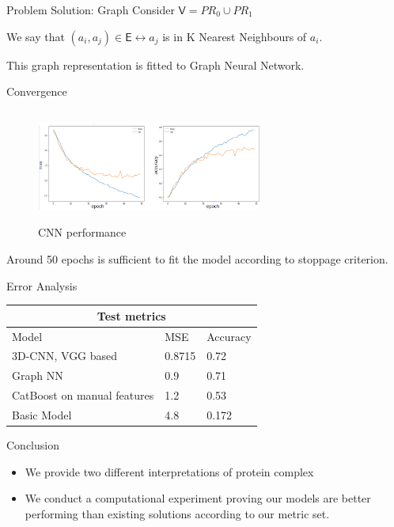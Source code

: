 \documentclass{beamer}
\begin{document}
\begin{frame}{Problem Solution: Graph}
Consider $\mathsf{V} = PR_0 \cup PR_1$
\bigskip

We say that $(a_i, a_j) \in \mathsf{E} \leftrightarrow a_j$ is in K Nearest Neighbours of $a_i$.
\bigskip

This graph representation is fitted to Graph Neural Network.
\end{frame}

\begin{frame}{Convergence}

\begin{figure}
\includegraphics[width=280px, height=140px]{CNN_error.png}
\caption{\label{fig:your-figure}CNN performance}
\end{figure}

Around 50 epochs is sufficient to fit the model according to stoppage criterion.
\end{frame}

\begin{frame}{Error Analysis}
\begin{tabular}{ |p{4cm}|p{3cm}|p{3cm}|  }
    \hline
    \multicolumn{3}{|c|}{Test metrics} \\
    \hline
    Model & MSE & Accuracy\\
    \hline
    3D-CNN, VGG based & 0.8715 & 0.72\\
    Graph NN & 0.9 & 0.71 \\
    CatBoost on manual features & 1.2 & 0.53\\
    Basic Model & 4.8 & 0.172\\
    \hline
\end{tabular}
\end{frame}

\begin{frame}{Conclusion}
\begin{itemize}
    \item We provide two different interpretations of protein complex
    \item We conduct a computational experiment proving our models are better performing than existing solutions according to our metric set. 
\end{itemize}
\end{frame}
\end{document}
